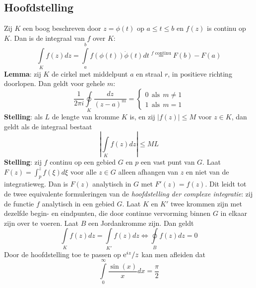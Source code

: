 \documentclass[twoside]{report}
\begin{document}
\subsection{Hoofdstelling}
Zij $K$ een boog beschreven door $z=\phi(t)$ op $a\leq t\leq b$ en $f(z)$
is continu op $K$. Dan is de integraal van $f$ over $K$:
\[
\int\limits_Kf(z)dz=\int\limits_a^bf(\phi(t))\dot{\phi}(t)dt
\stackrel{f\mbox{ continu}}{=}F(b)-F(a)
\]
{\bf Lemma}: zij $K$ de cirkel met middelpunt $a$ en straal $r$, in positieve
richting doorlopen. Dan geldt voor gehele $m$:
\[
\frac{1}{2\pi i}\oint\limits_K \frac{dz}{(z-a)^m}=\left\{
\begin{array}{l}
0~~\mbox{als}~~m\neq1\\
1~~\mbox{als}~~m=1
\end{array}\right.
\]
{\bf Stelling}: als $L$ de lengte van kromme $K$ is, en zij $|f(z)|\leq M$ voor
$z\in K$, dan geldt als de integraal bestaat
\[
\left|\int\limits_K f(z)dz\right|\leq ML
\]
{\bf Stelling}: zij $f$ continu op een gebied $G$ en $p$ een vast punt van
$G$. Laat $F(z)=\int_p^zf(\xi)d\xi$ voor alle $z\in G$ alleen afhangen van
$z$ en niet van de integratieweg. Dan is $F(z)$ analytisch in $G$ met $F'(z)=f(z)$.
\npar
Dit leidt tot de twee equivalente formuleringen van de {\it hoofdstelling der
complexe integratie}: zij de functie $f$ analytisch in een gebied $G$. Laat
$K$ en $K'$ twee krommen zijn met dezelfde begin- en eindpunten, die door
continue vervorming binnen $G$ in elkaar zijn over te voeren. Laat $B$ een
Jordankromme zijn. Dan geldt
\[
\int\limits_Kf(z)dz=\int\limits_{K'}f(z)dz\Leftrightarrow\oint\limits_Bf(z)dz=0
\]
Door de hoofdstelling toe te passen op ${\rm e}^{iz}/z$ kan men afleiden dat
\[
\int\limits_0^\infty\frac{\sin(x)}{x}dx=\frac{\pi}{2}
\]
\end{document}
